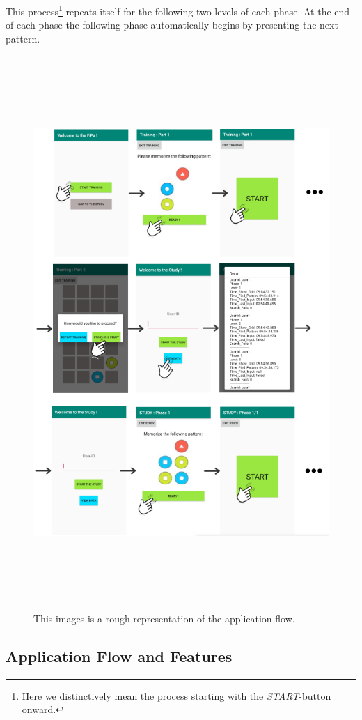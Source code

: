 This process\footnote{Here we distinctively mean the process starting with the \textit{START}-button onward.} repeats itself for the following two levels of each phase. At the end of each phase the following phase automatically begins by presenting the next pattern.

\begin{figure}[t!]
\centering
\includegraphics[width=15cm, height=21cm]{Chapters/graphics/flow.PNG}
\caption{This images is a rough representation of the application flow.}
\label{fig:flow}
\end{figure}

\subsection{Application Flow and Features} \label{4.3.2}

